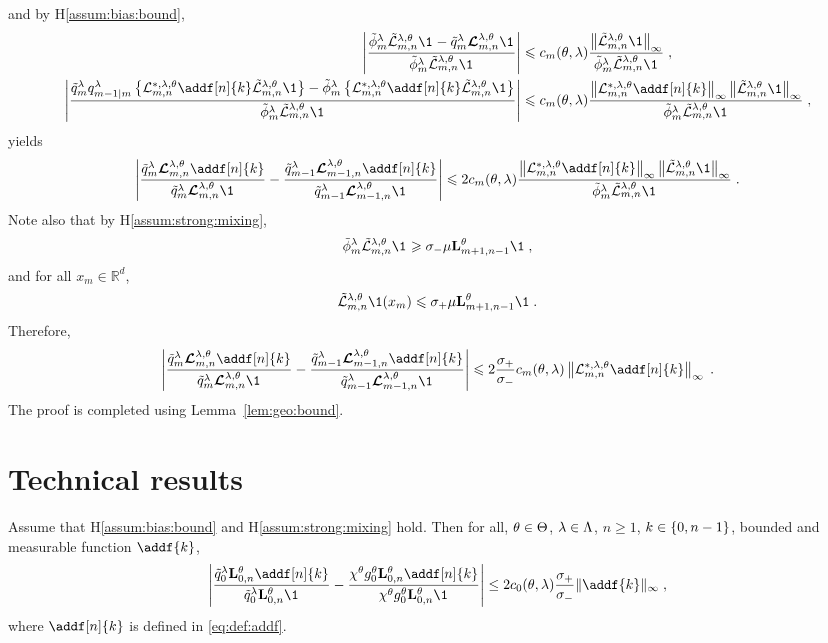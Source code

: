 \documentclass{article}
\begin{document}
and by H\ref{assum:bias:bound},
\begin{align*}
\left|\frac{\tilde\phi^\parvar_m\tilde{\mathcal{L}}^{\parvar,\parvec}_{m, n} \1_{}-\ivd{m} \retrokmod_{m, n} \1_{}}{\tilde\phi^\parvar_m\tilde{\mathcal{L}}^{\parvar,\parvec}_{m, n} \1_{}}\right|&\leqslant c_m(\parvec,\parvar)\frac{\left\|\tilde{\mathcal{L}}^{\parvar,\parvec}_{m, n} \1\right\|_\infty}{\tilde\phi^\parvar_m\tilde{\mathcal{L}}^{\parvar,\parvec}_{m, n}\1_{}}\eqsp,\\
\left|\frac{\ivd{m} \kvd{m-1 \vert m} \left\{\mathcal{L}^{*,\parvar,\parvec}_{m, n} \addf[n]{k}\tilde{\mathcal{L}}^{\parvar,\parvec}_{m, n} \1\right\} - \tilde\phi^\parvar_m\left\{\mathcal{L}^{*,\parvar,\parvec}_{m, n} \addf[n]{k}\tilde{\mathcal{L}}^{\parvar,\parvec}_{m, n} \1\right\}}{\tilde\phi^\parvar_m\tilde{\mathcal{L}}^{\parvar,\parvec}_{m, n} \1_{}}\right| &\leqslant c_m(\parvec,\parvar)\frac{\left\|\mathcal{L}^{*,\parvar,\parvec}_{m, n} \addf[n]{k}\right\|_\infty\left\|\tilde{\mathcal{L}}^{\parvar,\parvec}_{m, n} \1\right\|_\infty}{\tilde\phi^\parvar_m\tilde{\mathcal{L}}^{\parvar,\parvec}_{m, n}\1_{}}\eqsp,
\end{align*}
yields
$$
\left| \frac{\ivd{m} \retrokmod_{m, n} \addf[n]{k}}{\ivd{m} \retrokmod_{m, n} \1_{}} - \frac{\ivd{m - 1} \retrokmod_{m - 1, n} \addf[n]{k}}{\ivd{m - 1} \retrokmod_{m - 1, n} \1_{}} \right|\leqslant 2c_m(\parvec,\parvar)\frac{\left\|\mathcal{L}^{*,\parvar,\parvec}_{m, n} \addf[n]{k}\right\|_\infty\left\|\tilde{\mathcal{L}}^{\parvar,\parvec}_{m, n} \1\right\|_\infty}{\tilde\phi^\parvar_m\tilde{\mathcal{L}}^{\parvar,\parvec}_{m, n}\1_{}}\eqsp.
$$
Note also that by H\ref{assum:strong:mixing},
$$
\tilde\phi^\parvar_m\tilde{\mathcal{L}}^{\parvar,\parvec}_{m, n}\1_{} \geqslant \sigma_- \mu  \uk{m+1, n-1}{\parvec}\1\eqsp,
$$ 
and for all $x_m\in\mathbb{R}^d$,
$$
\tilde{\mathcal{L}}^{\parvar,\parvec}_{m, n} \1(x_m)\leqslant  \sigma_+\mu  \uk{m+1, n-1}{\parvec}\1\eqsp.
$$
Therefore,
$$
\left| \frac{\ivd{m} \retrokmod_{m, n} \addf[n]{k}}{\ivd{m} \retrokmod_{m, n} \1_{}} - \frac{\ivd{m - 1} \retrokmod_{m - 1, n} \addf[n]{k}}{\ivd{m - 1} \retrokmod_{m - 1, n} \1_{}} \right|\leqslant 2\frac{\sigma_+}{\sigma_-}c_m(\parvec,\parvar) \left\|\mathcal{L}^{*,\parvar,\parvec}_{m, n} \addf[n]{k}\right\|_\infty\eqsp.
$$
The proof is completed using Lemma~\ref{lem:geo:bound}.


\section{Technical results}
\begin{lemma}
\label{lem:initial:term}
Assume that H\ref{assum:bias:bound} and  H\ref{assum:strong:mixing} hold. Then for all, $\theta\in\Theta$, $\lambda\in\Lambda$, $n\geq  1$, $k \in \{ 0, n - 1 \}$, bounded and measurable function $\addf{k}$, 
$$
\left|\frac{\ivd{0} \uk{0, n}{\parvec} \addf[n]{k}}{\ivd{0} \uk{0, n}{\parvec} \1_{}} - \frac{\chi^\parvec \md{0}{\parvec}\uk{0, n}{\parvec} \addf[n]{k}}{\chi^\parvec\md{0}{\parvec}\uk{0, n}{\parvec} \1_{}} \right|\leq 2c_0(\parvec,\parvar)\frac{\sigma_+}{\sigma_-}\|\addf{k}\|_\infty \eqsp,
$$
where $\addf[n]{k}$ is defined in \eqref{eq:def:addf}.
\end{lemma}
\end{document}
